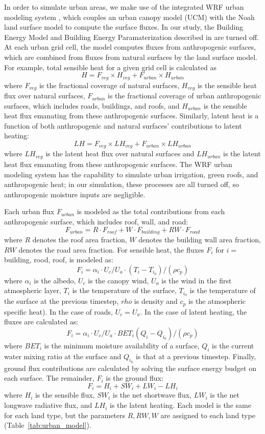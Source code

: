 \documentclass[draft,linenumbers]{agujournal}
\begin{document}
In order to simulate urban areas, we make use of the integrated WRF urban modeling system \citep{chen2011integrated}, which couples an urban canopy model (UCM) with the Noah land surface model to compute the surface fluxes. In our study, the Building Energy Model and Building Energy Paramaterization described in \cite{chen2011integrated} are turned off. At each urban grid cell, the model computes fluxes from anthropogenic surfaces, which are combined from fluxes from natural surfaces by the land surface model. 
For example, total sensible heat for a given grid cell is calculated as \[ H = F_{veg} \times H_{veg} + F_{urban}\times H_{urban}\]
where $F_{veg}$ is the fractional coverage of natural surfaces, $H_{veg}$ is the sensible heat flux over natural surfaces, $F_{urban}$ is the fractional coverage of urban anthropogenic surfaces, which includes roads, buildings, and roofs, and $H_{urban}$ is the sensible heat flux emanating from these anthropogenic surfaces. Similarly, latent heat is a function of both anthropogenic and natural surfaces' contributions to latent heating: 
\[LH = F_{veg} \times LH_{veg} + F_{urban}\times LH_{urban}\]
where $LH_{veg}$ is the latent heat flux over natural surfaces and $LH_{urban}$ is the latent heat flux emanating from these anthropogenic surfaces.
The WRF urban modeling system has the capability to simulate urban irrigation, green roofs, and anthropogenic heat; in our simulation, these processes are all turned off, so anthropogenic moisture inputs are negligible.

Each urban flux $F_{urban}$ is modeled as the total contributions from each anthropogenic surface, which includes roof, wall, and road: 
\[ F_{urban} = R\cdot F_{roof} + W\cdot F_{building} + RW\cdot F_{road} \]
where $R$ denotes the roof area fraction, $W$ denotes the building wall area fraction, $RW$ denotes the road area fraction. 
For sensible heat, the fluxes $F_i$ for $i=$building, rood, roof, is modeled as: 
\[F_i = \alpha_i\cdot U_c/U_a \cdot \left( T_i - T_{i_0}\right) / \left( \rho c_p \right ) \] 
where $\alpha_i $ is the albedo, $U_c$ is the canopy wind, $U_a$ is the wind in the first atmospheric layer, $T_i$ is the temperature of the surface, $T_{i_0}$ is the temperature of the surface at the previous timestep, $rho$ is density and $c_p$ is the atmospheric specific heat). In the case of roads, $U_c = U_a$.
In the case of latent heating, the fluxes are calculated as: 
\[F_i = \alpha_i \cdot U_c/U_a \cdot BET_i \left( Q_i - Q_{i_0}\right) / \left( \rho c_p \right ) \] 
where $BET_i$ is the minimum moisture availability of a surface, $Q_i$ is the current water mixing ratio at the surface and $Q_{i_0}$ is that at a previous timestep.
Finally, ground flux contributions are calculated by solving the surface energy budget on each surface. The remainder, $F_i$ is the ground flux: 
\[ F_i = H_i +SW_i + LW_i - LH_i\]
where $H_i$ is the sensible flux, $SW_i$ is the net shortwave flux, $LW_i$ is the net longwave radiative flux, and $LH_i$ is the latent heating. 
Each model is the same for each land type, but the parameters $R, RW, W$ are assigned to each land type (Table~\ref{tab:urban_model}). 
\end{document}
